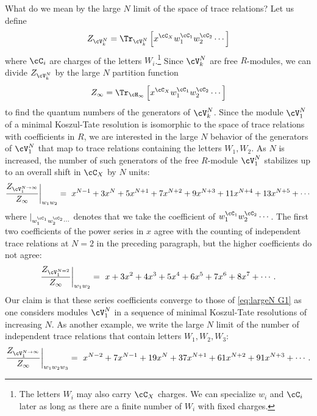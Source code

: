 \documentclass[a4paper,12pt]{article}
\begin{document}
What do we mean by the large $N$ limit of the space of trace relations? Let us define
\begin{equation}
Z_{\cV_k^N} = \Tr_{\cV_k^N} \left[ x^{\cC_X} w_1^{\cC_1} w_2^{\cC_2} \cdots \right]
\end{equation}
where $\cC_{i}$ are charges of the letters $W_{i}$.\footnote{The letters $W_i$ may also carry $\cC_X$ charges. We can specialize $w_i$ and $\cC_i$ later as long as there are a finite number of $W_i$ with fixed charges.} Since $\cV_k^N$ are free $R$-modules, we can divide $Z_{\cV_k^N}$ by the large $N$ partition function
\begin{equation}
Z_\infty = \Tr_{\cH_\infty} \left[ x^{\cC_X} w_1^{\cC_1} w_2^{\cC_2} \cdots \right]
\end{equation}
to find the quantum numbers of the generators of $\cV_k^N$. Since the module $\cV_{1}^N$ of a minimal Koszul-Tate resolution is isomorphic to the space of trace relations with coefficients in $R$, we are interested in the large $N$ behavior of the generators of $\cV_{1}^N$ that map to trace relations containing the letters $W_1, W_2$. As $N$ is increased, the number of such generators of the free $R$-module $\cV_{1}^N$ stabilizes up to an overall shift in $\cC_X$ by $N$ units:
\begin{equation} \label{eq:largeN G1}
\frac{Z_{\cV_{1}^{N \to \infty}}}{Z_\infty} \bigg\rvert_{w_1 w_2} = \ x^{N-1} + 3 x^{N} + 5 x^{N+1} + 7 x^{N+2} + 9 x^{N+3} + 11 x^{N+4} + 13 x^{N+5} + \cdots
\end{equation}
where $\rvert_{w_1^{\cC_1} w_2^{\cC_2} \cdots}$ denotes that we take the coefficient of $w_1^{\cC_1} w_2^{\cC_2} \cdots$. The first two coefficients of the power series in $x$ agree with the counting of independent trace relations at $N=2$ in the preceding paragraph, but the higher coefficients do not agree:
\begin{equation}
\frac{Z_{\cV_{1}^{N=2}}}{Z_\infty} \bigg\rvert_{w_1 w_2} = \ x + 3 x^{2} + 4 x^{3} + 5 x^{4} + 6 x^{5} + 7 x^{6} + 8 x^{7} + \cdots.
\end{equation}
Our claim is that these series coefficients converge to those of \eqref{eq:largeN G1} as one considers modules $\cV_{1}^N$ in a sequence of minimal Koszul-Tate resolutions of increasing $N$. As another example, we write the large $N$ limit of the number of independent trace relations that contain letters $W_1, W_2, W_3$:
\begin{equation}
\frac{Z_{\cV_{1}^{N \to \infty}}}{Z_\infty} \bigg\rvert_{w_1 w_2 w_3} = \ x^{N-2} + 7 x^{N-1} + 19 x^{N} + 37 x^{N+1} + 61 x^{N+2} + 91 x^{N+3} + \cdots.
\end{equation}
\end{document}
